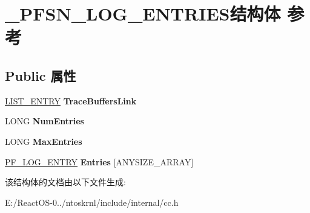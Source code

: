 \hypertarget{struct___p_f_s_n___l_o_g___e_n_t_r_i_e_s}{}\section{\+\_\+\+P\+F\+S\+N\+\_\+\+L\+O\+G\+\_\+\+E\+N\+T\+R\+I\+E\+S结构体 参考}
\label{struct___p_f_s_n___l_o_g___e_n_t_r_i_e_s}
\subsection*{Public 属性}
\begin{DoxyCompactItemize}
\item 
\mbox{\label{struct___p_f_s_n___l_o_g___e_n_t_r_i_e_s_ae51879132d5d5c96b8a467b7fa06f698}} 
\hyperlink{struct___l_i_s_t___e_n_t_r_y}{L\+I\+S\+T\+\_\+\+E\+N\+T\+RY} {\bfseries Trace\+Buffers\+Link}
\item 
\mbox{\label{struct___p_f_s_n___l_o_g___e_n_t_r_i_e_s_ad5fcfe1b3c30599f960e24b2980f7871}} 
L\+O\+NG {\bfseries Num\+Entries}
\item 
\mbox{\label{struct___p_f_s_n___l_o_g___e_n_t_r_i_e_s_a6b2e92af170e93ca0e4af6e1448d4703}} 
L\+O\+NG {\bfseries Max\+Entries}
\item 
\mbox{\label{struct___p_f_s_n___l_o_g___e_n_t_r_i_e_s_a0e83e49f68030fa34721ebc27d0af679}} 
\hyperlink{struct___p_f___l_o_g___e_n_t_r_y}{P\+F\+\_\+\+L\+O\+G\+\_\+\+E\+N\+T\+RY} {\bfseries Entries} \mbox{[}A\+N\+Y\+S\+I\+Z\+E\+\_\+\+A\+R\+R\+AY\mbox{]}
\end{DoxyCompactItemize}


该结构体的文档由以下文件生成\+:\begin{DoxyCompactItemize}
\item 
E\+:/\+React\+O\+S-\/0../ntoskrnl/include/internal/cc.\+h\end{DoxyCompactItemize}
